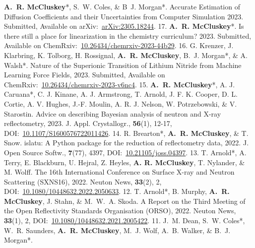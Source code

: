 \begin{cvpubys}
   \cvpuby
    {\textbf{A.~R. McCluskey}*, S.~W. Coles, \& B~J. Morgan*.}
    {Accurate Estimation of Diffusion Coefficients and their Uncertainties from Computer Simulation}
    {2023.}
    {Submitted,}
    {}
    {Available on arXiv:~\href{https://arxiv.org/abs/2305.18244}{arXiv:2305.18244}.}
    {17.}
   \cvpuby
    {\textbf{A.~R. McCluskey}*.}
    {Is there still a place for linearization in the chemistry curriculum?}
    {2023.}
    {Submitted,}
    {}
    {Available on ChemRxiv:~\href{https://doi.org/10.26434/chemrxiv-2023-44b29}{10.26434/chemrxiv-2023-44b29}.}
    {16.}
  \cvpuby
    {G. Krenzer, J. Klarbring, K. Tolborg, H. Rossignal, \textbf{A.~R. McCluskey}, B.~J. Morgan*, \& A. Walsh*.}
    {Nature of the Superionic Transition of Lithium Nitride from Machine Learning Force Fields,}
    {2023.}
    {Submitted,}
    {}
    {Available on ChemRxiv:~\href{https://doi.org/10.26434/chemrxiv-2023-v6nc4}{10.26434/chemrxiv-2023-v6nc4}.}
    {15.}
  \cvpuby
    {\textbf{A.~R. McCluskey}*, A. J. Caruana*, C. J. Kinane, A. J. Armstrong, T. Arnold, J. F. K. Cooper, D. L. Cortie, A. V. Hughes, J.-F. Moulin, A. R. J. Nelson, W. Potrzebowski, \& V. Starostin.}
    {Advice on describing Bayesian analysis of neutron and X-ray reflectometry,}
    {2023.}
    {J. Appl. Crystallogr.,}
    {\textbf{56}(1), 12-17,}
    {DOI:~\href{https://doi.org/10.1107/S1600576722011426}{10.1107/S1600576722011426}.}
    {14.}
  \cvpuby
    {R. Brearton*, \textbf{A.~R. McCluskey}, \& T. Snow.}
    {islatu: A Python package for the reduction of reflectometry data,}
    {2022.}
    {J. Open Source Softw.,}
    {\textbf{7}(77), 4397,}
    {DOI:~\href{https://doi.org/10.21105/joss.04397}{10.21105/joss.04397}.}
    {13.}
  \cvpuby
    {T. Arnold*, A. Terry, E. Blackburn, U. Hejral, Z. Heyles, \textbf{A. R. McCluskey}, T. Nylander, \& M. Wolff.}
    {The 16th International Conference on Surface X-ray and Neutron Scattering (SXNS16),}
    {2022.}
    {Neuton News,}
    {\textbf{33}(2), 2,}
    {DOI:~\href{https://doi.org/10.1080/10448632.2022.2050633}{10.1080/10448632.2022.2050633}.}
    {12.}
  \cvpuby
    {T. Arnold*, B. Murphy, \textbf{A.~R. McCluskey}, J. Stahn, \& M.~W.~A. Skoda.}
    {A Report on the Third Meeting of the Open Reflectivity Standards Organisation (ORSO),}
    {2022.}
    {Neuton News,}
    {\textbf{33}(1), 2,}
    {DOI:~\href{https://doi.org/10.1080/10448632.2021.2005422}{10.1080/10448632.2021.2005422}.}
    {11.}
  \cvpuby
    {J.~M. Dean, S.~W. Coles*, W.~R. Saunders, \textbf{A.~R. McCluskey}, M.~J. Wolf, A.~B. Walker, \& B.~J. Morgan*.}

\end{cvpubys}

